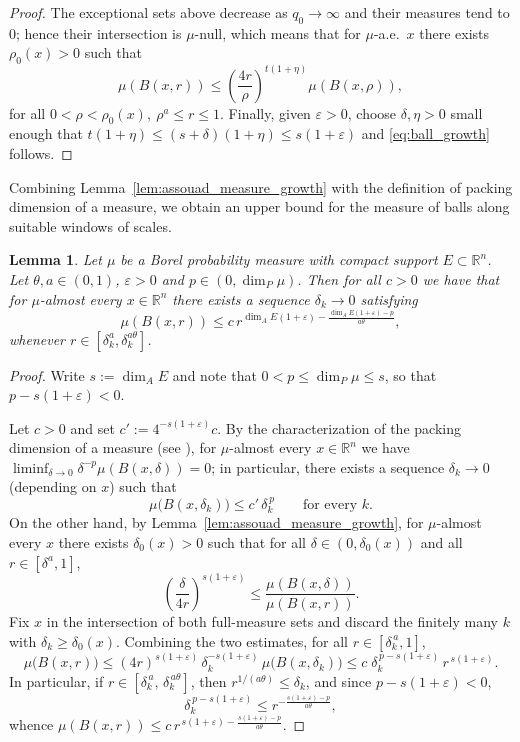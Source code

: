 \documentclass[12pt]{amsart}
\newtheorem{lemma}[theorem]{Lemma}
\theoremstyle{definition}
\theoremstyle{remark}
\numberwithin{equation}{section}
\begin{document}
\begin{proof}
The exceptional sets above decrease as
$q_{0}\to\infty$ and their measures tend to $0$; hence their
intersection is $\mu$-null, which means that for $\mu$-a.e.\ $x$ there
exists $\rho_{0}(x)>0$ such that
$$\mu(B(x,r))\leq\left(\frac{4r}{\rho}\right)^{t(1+\eta)}\mu(B(x,\rho)),$$
for all $0<\rho<\rho_{0}(x),\ \rho^{a}\leq r\leq 1$.
Finally, given $\varepsilon>0$, choose $\delta,\eta>0$ small enough that
$t(1+\eta)\leq (s+\delta)(1+\eta)\leq s(1+\varepsilon)$ and  \eqref{eq:ball_growth} follows.
\end{proof}



Combining Lemma~\ref{lem:assouad_measure_growth} with the definition of packing dimension of a measure, we obtain an
upper bound for the measure of balls along suitable windows of scales.


\begin{lemma}\label{Lemma 3.9}
Let $\mu$ be a Borel probability measure with compact support $E \subset \mathbb{R}^n$. 
Let $\theta, a \in (0,1)$, $\varepsilon>0$ and $ p \in (0,\dim_P \mu)$. Then for all $c>0$ we have that for $\mu$-almost every $x \in \mathbb{R}^n$ there exists a sequence $\delta_k \to 0$ satisfying
\[
\mu(B(x,r)) \leq c\, r^{\dim_A E(1+\varepsilon)-\frac{\dim_A E(1+\varepsilon)-p}{a\theta}},
\]
whenever $r \in [\delta_k^a,\delta_k^{a\theta}]$.
\end{lemma}
\begin{proof}
Write $s:=\dim_A E$ and note that $0<p\leq\dim_P\mu\leq s$, so that
$p-s(1+\varepsilon)<0$.

Let $c>0$ and set $c':=4^{-s(1+\varepsilon)}c$. By the characterization
of the packing dimension of a measure (see
\cite[Lemma 4.1]{hu1994fractal}), for $\mu$-almost every
$x\in\mathbb{R}^n$ we have
$\liminf_{\delta\to 0}\delta^{-p}\mu(B(x,\delta))=0$; in particular,
there exists a sequence $\delta_k\to 0$ (depending on $x$) such that
\[
\mu\bigl(B(x,\delta_k)\bigr)\leq c'\,\delta_k^{\,p}
\qquad\text{for every }k.
\]
On the other hand, by Lemma~\ref{lem:assouad_measure_growth}, for
$\mu$-almost every $x$ there exists $\delta_0(x)>0$ such that for all
$\delta\in(0,\delta_0(x))$ and all $r\in[\delta^a,1]$,
\[
\left(\frac{\delta}{4r}\right)^{s(1+\varepsilon)}
\leq \frac{\mu(B(x,\delta))}{\mu(B(x,r))}.
\]
Fix $x$ in the intersection of both full-measure sets and discard the
finitely many $k$ with $\delta_k\geq\delta_0(x)$. Combining the two
estimates, for all $r\in[\delta_k^{\,a},1]$,
\[
\mu\bigl(B(x,r)\bigr)
\leq (4r)^{s(1+\varepsilon)}\,\delta_k^{-s(1+\varepsilon)}\,
\mu\bigl(B(x,\delta_k)\bigr)
\leq c\;\delta_k^{\,p-s(1+\varepsilon)}\,r^{\,s(1+\varepsilon)}.
\]
In particular, if $r\in[\delta_k^{\,a},\,\delta_k^{\,a\theta}]$, then
$r^{1/(a\theta)}\leq\delta_k$, and since $p-s(1+\varepsilon)<0$,
\[
\delta_k^{\,p-s(1+\varepsilon)}\leq
r^{-\frac{s(1+\varepsilon)-p}{a\theta}},
\]
whence $\mu(B(x,r))\leq c\,
r^{\,s(1+\varepsilon)-\frac{s(1+\varepsilon)-p}{a\theta}}$.
\end{proof}
\end{document}
